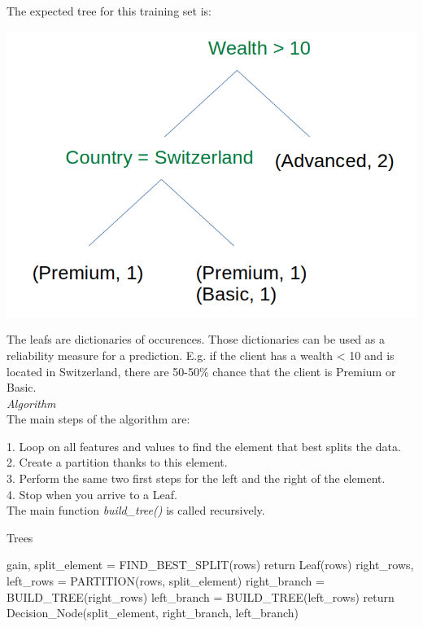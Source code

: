 The expected tree for this training set is:

\begin{center}
\includegraphics[scale=0.2]{trees_example.png}
\end{center}

The leafs are dictionaries of occurences. Those dictionaries can be used as a reliability measure for a prediction. E.g. if the client has a wealth < 10 and is located in Switzerland, there are 50-50\% chance that the client is Premium or Basic. \\

\textit{Algorithm} \\

The main steps of the algorithm are:

1. Loop on all features and values to find the element that best splits the data.\\
2. Create a partition thanks to this element. \\

3. Perform the same two first steps for the left and the right of the element. \\
4. Stop when you arrive to a Leaf. \\

The main function \textit{build\_tree()} is called recursively. 

\pagebreak

\begin{algorithm}
\caption{Trees}
\begin{algorithmic}
\State gain, split\_element = FIND\_BEST\_SPLIT(rows)
\State return Leaf(rows)
\EndIf
\State right\_rows, left\_rows = PARTITION(rows, split\_element)
\State right\_branch = BUILD\_TREE(right\_rows)
\State left\_branch = BUILD\_TREE(left\_rows)
\State return Decision\_Node(split\_element, right\_branch, left\_branch)
\EndProcedure
\end{algorithmic}
\end{algorithm}

